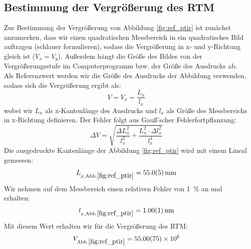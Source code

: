 \documentclass[10pt, a4paper]{article}
\begin{document}
\subsection{Bestimmung der Vergrößerung des RTM}
Zur Bestimmung der Vergrößerung von Abbildung \ref{fig:ref_ptir} ist zunächst anzumerken, dass wir einen quadratischen Messbereich in ein quadratisches Bild auftragen (schlauer formulieren), sodass die Vergrößerung in x- und y-Richtung gleich ist ($V_x = V_y$). Außerdem hängt die Größe des Bildes von der Vergrößerungsstufe im Computerprogramm bzw. der Größe des Ausdrucks ab. Als Referenzwert werden wir die Größe des Ausdrucks der Abbildung verwenden, sodass sich die Vergrößerung ergibt als:
\begin{equation}
  V = V_x = \frac{L_x}{l_x}
\end{equation}
wobei wir $L_x$ als x-Kantenlänge des Ausdrucks und $l_x$ als Größe des Messbereichs in x-Richtung definieren.
Der Fehler folgt aus Gauß'scher Fehlerfortpflanzung:
\begin{equation}
  \Delta V = \sqrt{\frac{\Delta L_x ^2}{l_x^2} + \frac{L_x^2 \cdot \Delta l_x^2}{l_x^4}}
\end{equation}
Die ausgedruckte Kantenlänge der Abbildung \ref{fig:ref_ptir} wird mit einem Lineal gemessen:
\begin{equation*}
  L_{x,\mathrm{Abb.\ref{fig:ref_ptir}}} = \SI{55 +- 0,5}{\milli\metre}
\end{equation*}
Wir nehmen auf dem Messbereich einen relativen Fehler von \SI{1}{\percent} an und erhalten:
\begin{align*}
  l_{x,\mathrm{Abb.\ref{fig:ref_ptir}}} = \SI{1,00 +- 0,01}{\nano\metre}
\end{align*}
Mit diesem Wert erhalten wir für die Vergrößerung des RTM:
\begin{align*}
  V_\mathrm{Abb.\ref{fig:ref_ptir}} = \num{55,0 +- 0,75e6}
\end{align*}
\end{document}

